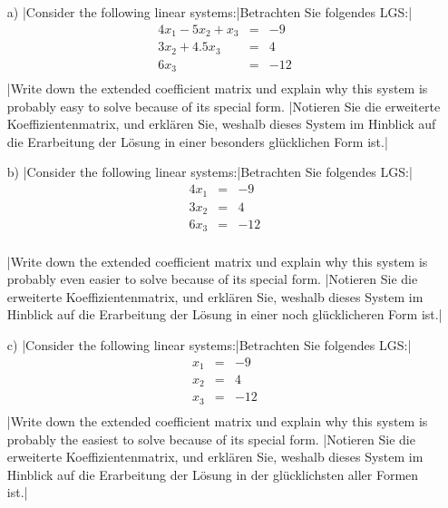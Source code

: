 \begin{exer}$ $
\begin{itemize}
\item[a)] \tr|Consider the following linear systems:|Betrachten Sie folgendes LGS:|
\[
\begin{array}{rcl}
4x_1-5x_2+x_3&=&-9\\
3x_2+4.5x_3&=&4\\
6x_3&=&-12\\
\end{array}
\] 
\tr|Write down the extended coefficient matrix und explain why this system is probably easy to solve because of its special form.
   |Notieren Sie die erweiterte Koeffizientenmatrix, und erklären Sie, weshalb dieses System im Hinblick auf die Erarbeitung der Lösung in einer besonders glücklichen Form ist.|

\vfill

\item[b)]\tr|Consider the following linear systems:|Betrachten Sie folgendes LGS:|
\[
\begin{array}{rcl}
4x_1&=&-9\\
3x_2&=&4\\
6x_3&=&-12\\
\end{array}
\] 
 

\tr|Write down the extended coefficient matrix und explain why this system is probably even easier to solve because of its special form.
   |Notieren Sie die erweiterte Koeffizientenmatrix, und erklären Sie, weshalb dieses System im Hinblick auf die Erarbeitung der Lösung in einer noch glücklicheren Form ist.|
\vfill


\item[c)]\tr|Consider the following linear systems:|Betrachten Sie folgendes LGS:|
\[
\begin{array}{rcl}
x_1&=&-9\\
x_2&=&4\\
x_3&=&-12\\
\end{array}
\] 
\tr|Write down the extended coefficient matrix und explain why this system is probably the easiest to solve because of its special form.
   |Notieren Sie die erweiterte Koeffizientenmatrix, und erklären Sie, weshalb dieses System im Hinblick auf die Erarbeitung der Lösung in der glücklichsten aller Formen ist.|
\end{itemize}
\end{exer}
\vfill

\newpage
 



